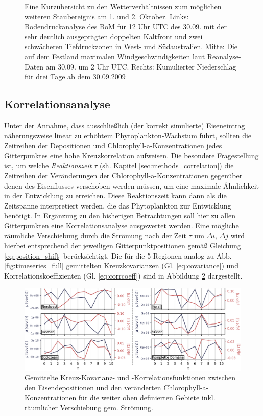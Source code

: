 \documentclass[12pt,a4paper,onecolumn,headheight=30pt]{scrartcl}
\begin{document}
\begin{figure}[htbp]
\begin{minipage}[c]{0.33\textwidth}
	\end{minipage}\hfill
	\caption{Eine Kurzübersicht zu den Wetterverhältnissen zum möglichen weiteren Staubereignis am 1. und 2. Oktober. Links: Bodendruckanalyse des BoM für 12 Uhr UTC des 30.09. mit der sehr deutlich ausgeprägten doppelten Kaltfront und zwei schwächeren Tiefdruckzonen in West- und Südaustralien. Mitte: Die auf dem Festland maximalen Windgeschwindigkeiten laut Reanalyse-Daten am 30.09. um 2 Uhr UTC. Rechts: Kumulierter Niederschlag für drei Tage ab dem 30.09.2009} \label{fig:october_weather}
\end{figure}
\subsection{Korrelationsanalyse} \label{sec:correlation_analysis}
Unter der Annahme, dass ausschließlich (der korrekt simulierte) Eiseneintrag näherungsweise linear zu erhöhtem Phytoplankton-Wachstum führt, sollten die Zeitreihen der Depositionen und Chlorophyll-a-Konzentrationen jedes Gitterpunktes eine hohe Kreuzkorrelation aufweisen. Die besondere Fragestellung ist, um welche \textit{Reaktionszeit} $\tau$ (sh. Kapitel \ref{sec:methods_correlation}) die Zeitreihen der Veränderungen der Chlorophyll-a-Konzentrationen gegenüber denen des Eisenflusses verschoben werden müssen, um eine maximale Ähnlichkeit in der Entwicklung zu erreichen. Diese Reaktionszeit kann dann als die Zeitspanne interpretiert werden, die das Phytoplankton zur Entwicklung benötigt. In Ergänzung zu den bisherigen Betrachtungen soll hier zu allen Gitterpunkten eine Korrelationsanalyse ausgewertet werden. Eine mögliche räumliche Verschiebung durch die Strömung nach der Zeit $\tau$ um $\Delta i$, $\Delta j$ wird hierbei entsprechend der jeweiligen Gitterpunktpositionen gemäß Gleichung \ref{eq:position_shift} berücksichtigt. Die für die 5 Regionen analog zu Abb. \ref{fig:timeseries_full} gemittelten Kreuzkovarianzen (Gl. \ref{eq:covariance}) und Korrelationskoeffizienten (Gl. \ref{eq:corrcoeff}) sind in Abbildung \ref{fig:section_cross_corr} dargestellt.
\begin{figure}[htbp]
\includegraphics[width=\textwidth]{bilder/section_crosscorr_noadv.png}
\caption{Gemittelte Kreuz-Kovarianz- und -Korrelationsfunktionen zwischen den Eisendepositionen und den veränderten Chlorophyll-a-Konzentrationen für die weiter oben definierten Gebiete inkl. räumlicher Verschiebung gem. Strömung.} \label{fig:section_cross_corr}
\end{figure}
\end{document}
